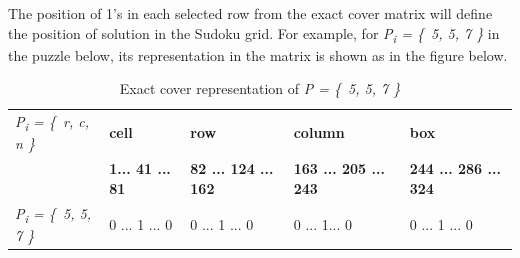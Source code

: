 \documentclass[a4paper,oneside,11pt]{report}
\begin{document}
The position of 1’s in each selected row from the exact cover matrix will define the position of solution in the Sudoku grid. For example, for {\itshape P\textsubscript{i} = \{\ 5, 5, 7 \}} in the puzzle below, its representation in the matrix is shown as  in the figure below.
\begin{table}[!ht]
\begin{tabular}{m{2.5cm} m{3cm} m{3cm} m{3cm} m{3cm}}
{\itshape P\textsubscript{i} = \{\ r, c, n \}} & \textbf{cell} & \textbf{row} & \textbf{column} & \textbf{box}\\ 
& \textbf{1\hspace{0.1cm}...\hspace{0.1cm} 41 \hspace{0.1cm}... \hspace{0.1cm}	81} & \textbf{82\hspace{0.1cm} ... 124 \hspace{0.1cm}... 162} & \textbf{163 ... 205 ... 243} & \textbf{244 ... 286 ... 324}\\ 
{\itshape P\textsubscript{i} = \{\ 5, 5, 7 \}} & 0\hspace{0.1cm} ...\hspace{0.1cm} 1 \hspace{0.2cm}... \hspace{0.1cm}	0 & 0 \hspace{0.2cm} ...\hspace{0.2cm} 1 \hspace{0.3cm}... \hspace{0.1cm}	0 & 0\hspace{0.4cm} ...\hspace{0.2cm} 1\hspace{0.28cm}... \hspace{0.1cm}0 & 0\hspace{0.4cm} ...\hspace{0.2cm} 1 \hspace{0.18cm}... \hspace{0.1cm}	0\\ 
\end{tabular}
\caption{{Exact cover representation of {\itshape P = \{\ 5, 5, 7 \}}}}
\end{table}
\end{document}
